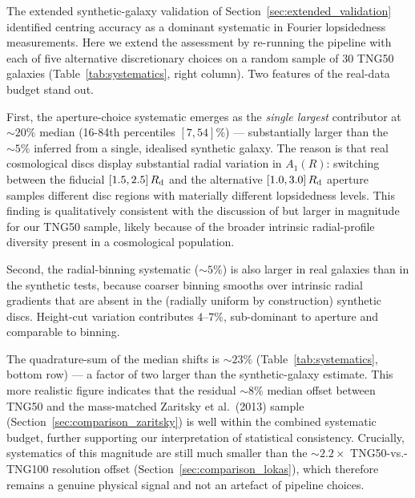 \documentclass[fleqn,usenatbib]{mnras}
\newcommand{\Am}[1]{A_{#1}}
\newcommand{\Rd}{R_{\rm d}}
\newcommand{\Amone}{\ensuremath{\Am{1}}}
\begin{document}
The extended synthetic-galaxy validation of
Section~\ref{sec:extended_validation} identified centring accuracy as
a dominant systematic in Fourier lopsidedness measurements.  Here we
extend the assessment by re-running the pipeline with each of five
alternative discretionary choices on a random sample of 30 TNG50
galaxies (Table~\ref{tab:systematics}, right column).  Two features
of the real-data budget stand out.

First, the aperture-choice systematic emerges as the \emph{single
largest} contributor at $\sim 20\%$ median (16-84th percentiles
$[7, 54]\%$) --- substantially larger than the $\sim 5\%$ inferred
from a single, idealised synthetic galaxy.  The reason is that
real cosmological discs display substantial radial variation in
$\Amone(R)$: switching between the fiducial $[1.5, 2.5]\,\Rd$ and
the alternative $[1.0, 3.0]\,\Rd$ aperture samples different
disc regions with materially different lopsidedness levels.  This
finding is qualitatively consistent with the discussion of
\citet{2013ApJ...772..135Z} but larger in magnitude for our TNG50
sample, likely because of the broader intrinsic radial-profile
diversity present in a cosmological population.

Second, the radial-binning systematic ($\sim 5\%$) is also larger
in real galaxies than in the synthetic tests, because coarser
binning smooths over intrinsic radial gradients that are absent
in the (radially uniform by construction) synthetic discs.
Height-cut variation contributes $4$--$7\%$, sub-dominant to
aperture and comparable to binning.

The quadrature-sum of the median shifts is
$\sim 23\%$ (Table~\ref{tab:systematics}, bottom row) --- a factor
of two larger than the synthetic-galaxy estimate.  This more
realistic figure indicates that the residual $\sim 8\%$ median
offset between TNG50 and the mass-matched Zaritsky et al.\ (2013)
sample (Section~\ref{sec:comparison_zaritsky}) is well within the
combined systematic budget, further supporting our interpretation
of statistical consistency.  Crucially, systematics of this
magnitude are still much smaller than the $\sim 2.2\times$
TNG50-vs.-TNG100 resolution offset
(Section~\ref{sec:comparison_lokas}), which therefore remains a
genuine physical signal and not an artefact of pipeline choices.
\end{document}
